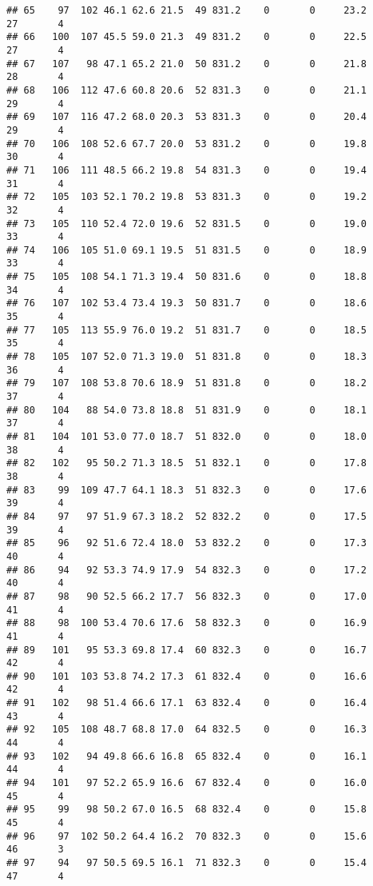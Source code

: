 \documentclass[
]{article}
\begin{document}
\begin{verbatim}
## 65    97  102 46.1 62.6 21.5  49 831.2    0       0     23.2      27       4
## 66   100  107 45.5 59.0 21.3  49 831.2    0       0     22.5      27       4
## 67   107   98 47.1 65.2 21.0  50 831.2    0       0     21.8      28       4
## 68   106  112 47.6 60.8 20.6  52 831.3    0       0     21.1      29       4
## 69   107  116 47.2 68.0 20.3  53 831.3    0       0     20.4      29       4
## 70   106  108 52.6 67.7 20.0  53 831.2    0       0     19.8      30       4
## 71   106  111 48.5 66.2 19.8  54 831.3    0       0     19.4      31       4
## 72   105  103 52.1 70.2 19.8  53 831.3    0       0     19.2      32       4
## 73   105  110 52.4 72.0 19.6  52 831.5    0       0     19.0      33       4
## 74   106  105 51.0 69.1 19.5  51 831.5    0       0     18.9      33       4
## 75   105  108 54.1 71.3 19.4  50 831.6    0       0     18.8      34       4
## 76   107  102 53.4 73.4 19.3  50 831.7    0       0     18.6      35       4
## 77   105  113 55.9 76.0 19.2  51 831.7    0       0     18.5      35       4
## 78   105  107 52.0 71.3 19.0  51 831.8    0       0     18.3      36       4
## 79   107  108 53.8 70.6 18.9  51 831.8    0       0     18.2      37       4
## 80   104   88 54.0 73.8 18.8  51 831.9    0       0     18.1      37       4
## 81   104  101 53.0 77.0 18.7  51 832.0    0       0     18.0      38       4
## 82   102   95 50.2 71.3 18.5  51 832.1    0       0     17.8      38       4
## 83    99  109 47.7 64.1 18.3  51 832.3    0       0     17.6      39       4
## 84    97   97 51.9 67.3 18.2  52 832.2    0       0     17.5      39       4
## 85    96   92 51.6 72.4 18.0  53 832.2    0       0     17.3      40       4
## 86    94   92 53.3 74.9 17.9  54 832.3    0       0     17.2      40       4
## 87    98   90 52.5 66.2 17.7  56 832.3    0       0     17.0      41       4
## 88    98  100 53.4 70.6 17.6  58 832.3    0       0     16.9      41       4
## 89   101   95 53.3 69.8 17.4  60 832.3    0       0     16.7      42       4
## 90   101  103 53.8 74.2 17.3  61 832.4    0       0     16.6      42       4
## 91   102   98 51.4 66.6 17.1  63 832.4    0       0     16.4      43       4
## 92   105  108 48.7 68.8 17.0  64 832.5    0       0     16.3      44       4
## 93   102   94 49.8 66.6 16.8  65 832.4    0       0     16.1      44       4
## 94   101   97 52.2 65.9 16.6  67 832.4    0       0     16.0      45       4
## 95    99   98 50.2 67.0 16.5  68 832.4    0       0     15.8      45       4
## 96    97  102 50.2 64.4 16.2  70 832.3    0       0     15.6      46       3
## 97    94   97 50.5 69.5 16.1  71 832.3    0       0     15.4      47       4

\end{verbatim}
\end{document}
